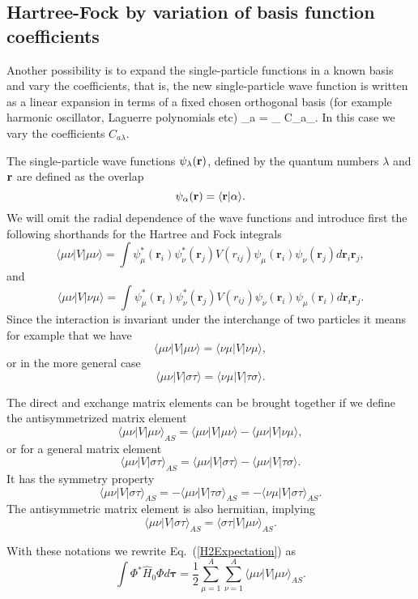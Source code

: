 \subsection{Hartree-Fock by variation of basis function coefficients}
Another possibility is to expand the single-particle functions in a known basis  and vary the coefficients, 
that is, the new single-particle wave function is written as a linear expansion
in terms of a fixed chosen orthogonal basis (for example harmonic oscillator, Laguerre polynomials etc)
\be
\psi_a  = \sum_{\lambda} C_{a\lambda}\psi_{\lambda}.
\label{eq:newbasis}
\ee
In this case we vary the coefficients $C_{a\lambda}$. 

The single-particle wave functions $\psi_{\lambda}({\bf r})$, defined by the quantum numbers $\lambda$ and ${\bf r}$
are defined as the overlap 
\[
   \psi_{\alpha}({\bf r})  = \langle {\bf r} | \alpha \rangle .
\]
We will omit the radial dependence of the wave functions and 
introduce first the following shorthands for the Hartree and Fock integrals
\[
\langle \mu\nu|V|\mu\nu\rangle =  \int \psi_{\mu}^*(\mathbf{r}_i)\psi_{\nu}^*(\mathbf{r}_j)V(r_{ij})\psi_{\mu}(\mathbf{r}_i)\psi_{\nu}(\mathbf{r}_j)
    d\mathbf{r}_i\mathbf{r}_j,
\]
and 
\[
\langle \mu\nu|V|\nu\mu\rangle = \int \psi_{\mu}^*(\mathbf{r}_i)\psi_{\nu}^*(\mathbf{r}_j)
  V(r_{ij})\psi_{\nu}(\mathbf{r}_i)\psi_{\mu}(\mathbf{r}_i)
  d\mathbf{r}_i\mathbf{r}_j.  
\]
Since the interaction is invariant under the interchange of two particles it means for example that we have
\[
\langle \mu\nu|V|\mu\nu\rangle =  \langle \nu\mu|V|\nu\mu\rangle,  
\]
or in the more general case
\[
\langle \mu\nu|V|\sigma\tau\rangle =  \langle \nu\mu|V|\tau\sigma\rangle.  
\]

The direct and exchange matrix elements can be  brought together if we define the antisymmetrized matrix element
\[
\langle \mu\nu|V|\mu\nu\rangle_{AS}= \langle \mu\nu|V|\mu\nu\rangle-\langle \mu\nu|V|\nu\mu\rangle,
\]
or for a general matrix element  
\[
\langle \mu\nu|V|\sigma\tau\rangle_{AS}= \langle \mu\nu|V|\sigma\tau\rangle-\langle \mu\nu|V|\tau\sigma\rangle.
\]
It has the symmetry property
\[
\langle \mu\nu|V|\sigma\tau\rangle_{AS}= -\langle \mu\nu|V|\tau\sigma\rangle_{AS}=-\langle \nu\mu|V|\sigma\tau\rangle_{AS}.
\]
The antisymmetric matrix element is also hermitian, implying 
\[
\langle \mu\nu|V|\sigma\tau\rangle_{AS}= \langle \sigma\tau|V|\mu\nu\rangle_{AS}.
\]

With these notations we rewrite Eq.~(\ref{H2Expectation}) as 
\begin{equation}
  \int \Phi^*\hat{H}_0\Phi d\mathbf{\tau} 
  = \frac{1}{2}\sum_{\mu=1}^A\sum_{\nu=1}^A \langle \mu\nu|V|\mu\nu\rangle_{AS}.
\label{H2Expectation2}
\end{equation}


